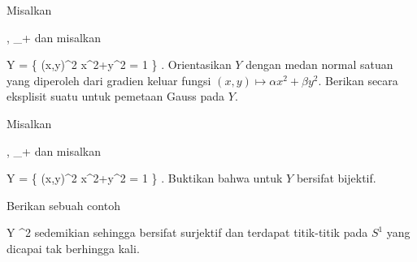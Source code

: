 {}
{

Misalkan

\mavergleichskette
{\vergleichskette
{ \alpha,\beta
}
{ \in }{ \R_+
}
{  }{
}
{    }{
}
{   }{
}
}
{}{}{}
dan misalkan

\mavergleichskettedisp
{\vergleichskette
{ Y
}
{ =} { \left\{ (x,y)\in\R^2  \mid   \alpha x^2+\beta y^2 = 1        \right\}
}
{ } {
}
{ } {
}
{ } {
}
}
{}{}{.}
Orientasikan $Y$ dengan medan normal satuan yang diperoleh dari gradien keluar fungsi
$ (x,y) \longmapsto \alpha x^2+\beta y^2 $.
 { Berikan secara eksplisit suatu
untuk pemetaan Gauss pada $Y$.
}

}
{} {}

{}
{

Misalkan

\mavergleichskette
{\vergleichskette
{ \alpha,\beta
}
{ \in }{ \R_+
}
{  }{
}
{    }{
}
{   }{
}
}
{}{}{}
dan misalkan

\mavergleichskettedisp
{\vergleichskette
{ Y
}
{ =} { \left\{ (x,y)\in\R^2  \mid   \alpha x^2+\beta y^2 = 1        \right\}
}
{ } {
}
{ } {
}
{ } {
}
}
{}{}{.}
Buktikan bahwa
untuk $Y$ bersifat bijektif.

}
{} {}

{}
{

Berikan sebuah contoh

\mavergleichskette
{\vergleichskette
{ Y
}
{ \subseteq }{ \R^2
}
{  }{
}
{    }{
}
{   }{
}
}
{}{}{}
sedemikian sehingga
bersifat surjektif dan terdapat titik-titik pada $S^1$ yang dicapai tak berhingga kali.

}
{} {}

